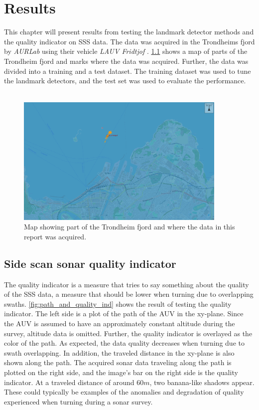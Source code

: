 \chapter{Results}

This chapter will present results from testing the landmark detector methods and the quality indicator on SSS data. The data was acquired in the Trondheims fjord by \textit{AURLab} using their vehicle \textit{LAUV Fridtjof} \cite{LAUVNTNU}. \cref{fig:neptus_screenshot} shows a map of parts of the Trondheim fjord and marks where the data was acquired. Further, the data was divided into a training and a test dataset. The training dataset was used to tune the landmark detectors, and the test set was used to evaluate the performance. 
\\
\\

\begin{figure} [h]%
  \centering
  \includegraphics[width=0.9\textwidth]{figures/neptus_screenshot.png}
  \caption{Map showing part of the Trondheim fjord and where the data in this report was acquired.}
  \label{fig:neptus_screenshot}
\end{figure}

\section{Side scan sonar quality indicator}

The quality indicator is a measure that tries to say something about the quality of the SSS data, a measure that should be lower when turning due to overlapping swaths. \cref{fig:path_and_quality_ind} shows the result of testing the quality indicator. The left side is a plot of the path of the AUV in the xy-plane. Since the AUV is assumed to have an approximately constant altitude during the survey, altitude data is omitted. Further, the quality indicator is overlayed as the color of the path. As expected, the data quality decreases when turning due to swath overlapping. In addition, the traveled distance in the xy-plane is also shown along the path. The acquired sonar data traveling along the path is plotted on the right side, and the image's bar on the right side is the quality indicator. At a traveled distance of around $60 m$, two banana-like shadows appear. These could typically be examples of the anomalies and degradation of quality experienced when turning during a sonar survey. 

